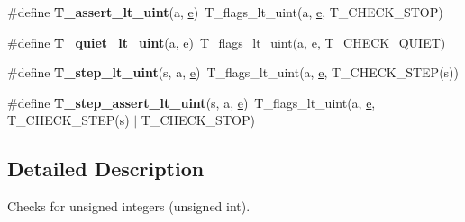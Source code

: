 \begin{DoxyCompactItemize}
\item 
\mbox{\label{group__RTEMSTestFrameworkChecksUInt_ga0e1c7e68068f8ae92bb024a5d303d876}} 
\#define {\bfseries T\+\_\+assert\+\_\+lt\+\_\+uint}(a,  \mbox{\hyperlink{sun4u_2tte_8h_a8b0b9ed08e0e18920ec2682f48228c27}{e}})~T\+\_\+flags\+\_\+lt\+\_\+uint(a, \mbox{\hyperlink{sun4u_2tte_8h_a8b0b9ed08e0e18920ec2682f48228c27}{e}}, T\+\_\+\+C\+H\+E\+C\+K\+\_\+\+S\+T\+OP)
\item 
\mbox{\label{group__RTEMSTestFrameworkChecksUInt_ga4257b9abfe32ed425abde4fc0430ce22}} 
\#define {\bfseries T\+\_\+quiet\+\_\+lt\+\_\+uint}(a,  \mbox{\hyperlink{sun4u_2tte_8h_a8b0b9ed08e0e18920ec2682f48228c27}{e}})~T\+\_\+flags\+\_\+lt\+\_\+uint(a, \mbox{\hyperlink{sun4u_2tte_8h_a8b0b9ed08e0e18920ec2682f48228c27}{e}}, T\+\_\+\+C\+H\+E\+C\+K\+\_\+\+Q\+U\+I\+ET)
\item 
\mbox{\label{group__RTEMSTestFrameworkChecksUInt_gad64caddd68c19123be12d2747e79155b}} 
\#define {\bfseries T\+\_\+step\+\_\+lt\+\_\+uint}(s,  a,  \mbox{\hyperlink{sun4u_2tte_8h_a8b0b9ed08e0e18920ec2682f48228c27}{e}})~T\+\_\+flags\+\_\+lt\+\_\+uint(a, \mbox{\hyperlink{sun4u_2tte_8h_a8b0b9ed08e0e18920ec2682f48228c27}{e}}, T\+\_\+\+C\+H\+E\+C\+K\+\_\+\+S\+T\+EP(s))
\item 
\mbox{\label{group__RTEMSTestFrameworkChecksUInt_ga862c99113b623e3d1a0a3f6973a5ac92}} 
\#define {\bfseries T\+\_\+step\+\_\+assert\+\_\+lt\+\_\+uint}(s,  a,  \mbox{\hyperlink{sun4u_2tte_8h_a8b0b9ed08e0e18920ec2682f48228c27}{e}})~T\+\_\+flags\+\_\+lt\+\_\+uint(a, \mbox{\hyperlink{sun4u_2tte_8h_a8b0b9ed08e0e18920ec2682f48228c27}{e}}, T\+\_\+\+C\+H\+E\+C\+K\+\_\+\+S\+T\+EP(s) $\vert$ T\+\_\+\+C\+H\+E\+C\+K\+\_\+\+S\+T\+OP)
\end{DoxyCompactItemize}


\subsection{Detailed Description}
Checks for unsigned integers (unsigned int). 

